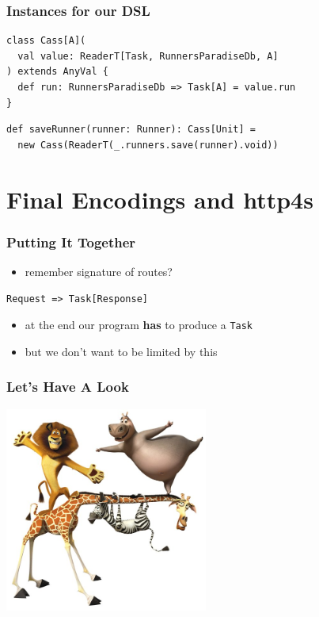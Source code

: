 \documentclass{beamer}
\begin{document}
\begin{frame}
  \frametitle{Instances for our DSL}
\begin{verbatim}
class Cass[A](
  val value: ReaderT[Task, RunnersParadiseDb, A]
) extends AnyVal {
  def run: RunnersParadiseDb => Task[A] = value.run
}
\end{verbatim}
  \vfill
\begin{verbatim}
def saveRunner(runner: Runner): Cass[Unit] =
  new Cass(ReaderT(_.runners.save(runner).void))
\end{verbatim}
\end{frame}

\section{Final Encodings and http4s}

\begin{frame}[fragile]
  \frametitle{Putting It Together}
  \begin{itemize}
  \item remember signature of routes?
  \end{itemize}
\begin{verbatim}
Request => Task[Response]
\end{verbatim}
  \begin{itemize}
  \item at the end our program \textbf{has} to produce a \texttt{Task}
  \item but we don't want to be limited by this
  \end{itemize}
\end{frame}

\begin{frame}
  \frametitle{Let's Have A Look}
  \begin{center}
    \includegraphics[width=0.5\textwidth]{pics/review.jpg}
  \end{center}
\end{frame}
\end{document}
